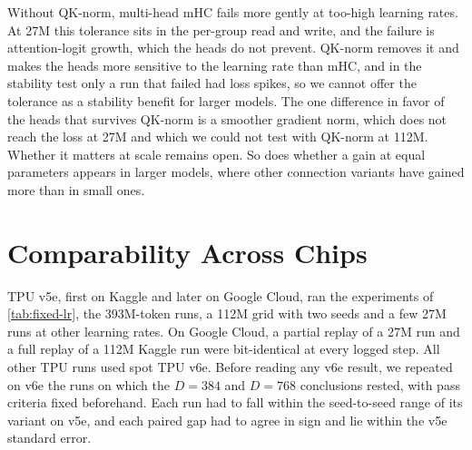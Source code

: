 \documentclass[11pt, a4paper]{article}
\begin{document}
Without QK-norm, multi-head mHC fails more gently at too-high learning rates. At 27M this tolerance sits in the per-group read
and write, and the failure is attention-logit growth, which the heads do not prevent. QK-norm removes it and makes the heads more sensitive to the learning
rate than mHC, and in the stability test only a run that failed had loss spikes, so we cannot offer the tolerance as a stability
benefit for larger models. The one difference in favor of the heads that survives QK-norm is a smoother gradient norm,
which does not reach the loss at 27M and which we could not test with QK-norm at 112M. Whether it matters at scale remains open.
So does whether a gain at equal parameters appears in larger models, where other connection variants have gained more than in
small ones.

\renewcommand{\bibfont}{\small\raggedright}%
\renewcommand{\bibsection}{\section*{\refname}\phantomsection\addcontentsline{toc}{section}{\refname}\markboth{\refname}{}}


\appendix

\section{Comparability Across Chips}
\label{app:chips}

TPU v5e, first on Kaggle and later on Google Cloud, ran the experiments of \cref{tab:fixed-lr}, the 393M-token runs, a
112M grid with two seeds and a few 27M runs at other learning rates. On Google Cloud, a partial replay of a 27M run and a full replay of a 112M
Kaggle run were bit-identical at every logged step. All other TPU runs used spot TPU v6e. Before reading any v6e result, we
repeated on v6e the runs on which the $D = 384$ and $D = 768$ conclusions rested, with pass criteria fixed beforehand. Each run
had to fall within the seed-to-seed range of its variant on v5e, and each paired gap had to agree in sign and lie within the v5e
standard error.
\end{document}
